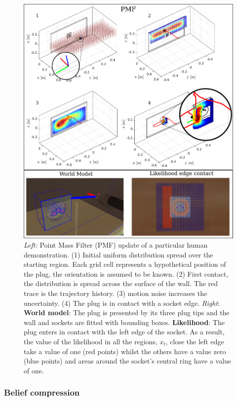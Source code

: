\begin{figure}
 \centering
   \includegraphics[width=\textwidth]{./ch4-PiH/Figures/PMF/pmf_likelihood_v2.pdf}
   \caption{\textit{Left:} Point Mass Filter (PMF) update of a particular human demonstration. (1) Initial uniform distribution spread over the starting 
   region. Each grid cell represents a hypothetical position of the plug, the orientation is assumed to be known. (2) First contact, the distribution 
   is spread across the surface of the wall. The red trace is the trajectory history. (3) motion noise increases the uncertainty. (4) The plug is in contact with a socket edge.
   \textit{Right}: \textbf{World model}: The plug is presented by its three plug tips and the wall and sockets are fitted with bounding boxes.
   \textbf{Likelihood}: The plug enters in contact with the left edge of the socket. As a result, the value of the likelihood in all the regions, $x_t$, close the left edge take 
   a value of one (red points)  whilst the others have a value zero (blue points) and areas around the socket's central 
   ring have a value of one. }
  \label{fig:PMF}
\end{figure}

\subsubsection{Belief compression}

